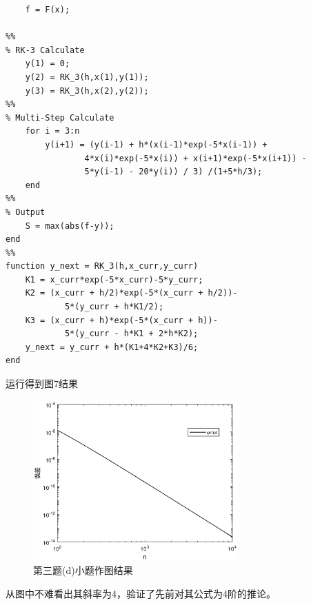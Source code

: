 \documentclass[12pt,a4paper,utf8]{ctexart}
\begin{document}
\begin{enumerate}
\begin{lstlisting}[frame=single]
% for error
    f = F(x);

%%
% RK-3 Calculate
    y(1) = 0;
    y(2) = RK_3(h,x(1),y(1));
    y(3) = RK_3(h,x(2),y(2));
%%
% Multi-Step Calculate
    for i = 3:n
        y(i+1) = (y(i-1) + h*(x(i-1)*exp(-5*x(i-1)) +
                4*x(i)*exp(-5*x(i)) + x(i+1)*exp(-5*x(i+1)) -
                5*y(i-1) - 20*y(i)) / 3) /(1+5*h/3);
    end
%%
% Output
    S = max(abs(f-y));
end
%%
function y_next = RK_3(h,x_curr,y_curr)
    K1 = x_curr*exp(-5*x_curr)-5*y_curr;
    K2 = (x_curr + h/2)*exp(-5*(x_curr + h/2))-
            5*(y_curr + h*K1/2);
    K3 = (x_curr + h)*exp(-5*(x_curr + h))-
            5*(y_curr - h*K1 + 2*h*K2);
    y_next = y_curr + h*(K1+4*K2+K3)/6;
end
\end{lstlisting}
运行得到图7结果
\begin{figure}[htbp]
    \centering
    \includegraphics[width=0.7\textwidth]{image/T3_d.eps}
    \caption{第三题(d)小题作图结果}
\end{figure}
从图中不难看出其斜率为4，验证了先前对其公式为4阶的推论。
\end{enumerate}
\end{document}
